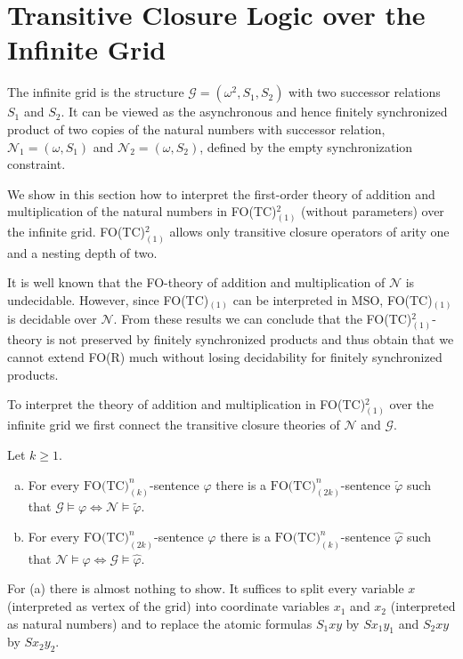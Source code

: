 \documentclass{LMCS}
\renewcommand{\phi}{\varphi}
\begin{document}
\section{Transitive Closure Logic over the Infinite Grid}

The infinite grid is the structure $\mathcal G = (\omega^2, S_1, S_2)$
with two successor relations $S_1$ and $S_2$. It can be viewed 
as the asynchronous and hence finitely synchronized product of two copies
of the natural numbers with successor relation, $\mathcal N_1=(\omega, S_1)$ and 
$\mathcal N_2=(\omega,S_2)$, defined by the empty synchronization constraint.

We show in this section how to interpret the first-order theory of 
addition and multiplication of the natural numbers  
in FO(TC)$_{(1)}^2$ (without parameters) over the infinite grid. 
FO(TC)$_{(1)}^2$ allows only transitive closure operators of arity one and 
a nesting depth of two. 

It is well known that the FO-theory of addition and multiplication 
of $\mathcal N$ is undecidable. However, since FO(TC)$_{(1)}$ can be interpreted
in MSO,  FO(TC)$_{(1)}$ is decidable over $\mathcal N$. From these results we can 
conclude that the  FO(TC)$_{(1)}^2$-theory is not preserved by finitely
synchronized products and thus obtain that we cannot extend FO(R)
much without losing decidability for finitely synchronized products.

To interpret the theory of addition and multiplication in FO(TC)$_{(1)}^2$
over the infinite grid we first connect the transitive closure theories of
$\mathcal N$ and $\mathcal G$.

\begin{lem}\label{lem:grid<->N} Let $k \ge 1$.
\begin{enumerate}[(a)] 
\item For every $\textrm{FO(TC)}_{(k)}^n$-sentence $\phi$ there is a 
$\textrm{FO(TC)}_{(2k)}^n$-sentence $\tilde \phi$ such that 
$\mathcal G \models \phi \Leftrightarrow \mathcal N \models \tilde \phi$.
\item 
For every $\textrm{FO(TC)}_{(2k)}^n$-sentence $\phi$ there is a 
$\textrm{FO(TC)}_{(k)}^n$-sentence $\hat \phi$ such that 
$\mathcal N \models \phi \Leftrightarrow \mathcal G \models \hat \phi$.
\end{enumerate}
\end{lem}
\proof
For (a) there is almost nothing to show. It suffices to split every variable
$x$ (interpreted as vertex of the grid) into coordinate variables $x_1$ and $x_2$
(interpreted as natural numbers) and to replace the atomic formulas
$S_1 xy$ by $S x_1 y_1$ and $S_2 x y$ by  $S x_2 y_2$. 
\end{document}
